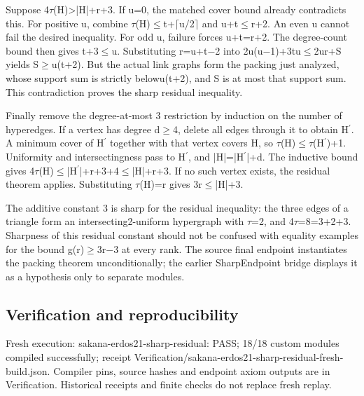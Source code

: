 \documentclass[11pt,a4paper]{article}
\begin{document}
Suppose 4\ensuremath{\tau}(H)>|H|+r+3. If u=0, the matched cover bound already contradicts this. For positive u, combine \ensuremath{\tau}(H)\ensuremath{\leq}t+\ensuremath{\lceil}u/2\ensuremath{\rceil} and u+t\ensuremath{\leq}r+2. An even u cannot fail the desired inequality. For odd u, failure forces u+t=r+2. The degree-count bound then gives t+3\ensuremath{\leq}u. Substituting r=u+t\ensuremath{-}2 into 2u(u\ensuremath{-}1)+3tu\ensuremath{\leq}2ur+S yields S\ensuremath{\geq}u(t+2). But the actual link graphs form the packing just analyzed, whose support sum is strictly belowu(t+2), and S is at most that support sum. This contradiction proves the sharp residual inequality.

Finally remove the degree-at-most 3 restriction by induction on the number of hyperedges. If a vertex has degree d\ensuremath{\geq}4, delete all edges through it to obtain H\ensuremath{^{\prime}}. A minimum cover of H\ensuremath{^{\prime}} together with that vertex covers H, so \ensuremath{\tau}(H)\ensuremath{\leq}\ensuremath{\tau}(H\ensuremath{^{\prime}})+1. Uniformity and intersectingness pass to H\ensuremath{^{\prime}}, and |H|=|H\ensuremath{^{\prime}}|+d. The inductive bound gives 4\ensuremath{\tau}(H)\ensuremath{\leq}|H\ensuremath{^{\prime}}|+r+3+4\ensuremath{\leq}|H|+r+3. If no such vertex exists, the residual theorem applies. Substituting \ensuremath{\tau}(H)=r gives 3r\ensuremath{\leq}|H|+3.

The additive constant 3 is sharp for the residual inequality: the three edges of a triangle form an intersecting2-uniform hypergraph with \ensuremath{\tau}=2, and 4\ensuremath{\tau}=8=3+2+3. Sharpness of this residual constant should not be confused with equality examples for the bound g(r)\ensuremath{\geq}3r\ensuremath{-}3 at every rank. The source final endpoint instantiates the packing theorem unconditionally; the earlier SharpEndpoint bridge displays it as a hypothesis only to separate modules.

\subsection{Verification and reproducibility}
Fresh execution: sakana-erdos21-sharp-residual: PASS; 18/18 custom modules compiled successfully; receipt Verification/sakana-erdos21-sharp-residual-fresh-build.json. Compiler pins, source hashes and endpoint axiom outputs are in Verification. Historical receipts and finite checks do not replace fresh replay.
\end{document}
